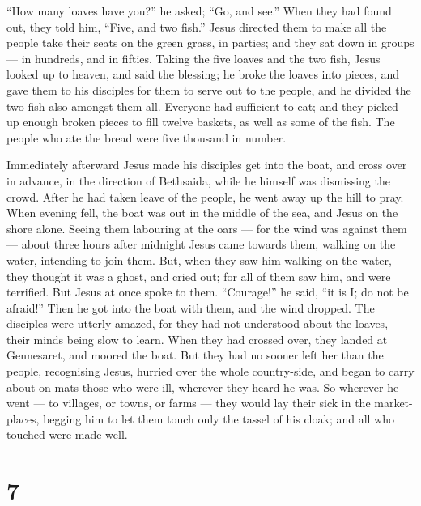  ``How many loaves have you?'' he asked; ``Go, and see.''
When they had found out, they told him, ``Five, and two fish.''
 Jesus directed them to make all the people take their
seats on the green grass, in parties;  and they sat down in
groups --- in hundreds, and in fifties.  Taking the five
loaves and the two fish, Jesus looked up to heaven, and said the
blessing; he broke the loaves into pieces, and gave them to his
disciples for them to serve out to the people, and he divided the two
fish also amongst them all.  Everyone had sufficient to
eat;  and they picked up enough broken pieces to fill
twelve baskets, as well as some of the fish.  The people
who ate the bread were five thousand in number.

 Immediately afterward Jesus made his disciples get into
the boat, and cross over in advance, in the direction of Bethsaida,
while he himself was dismissing the crowd.  After he had
taken leave of the people, he went away up the hill to pray.
 When evening fell, the boat was out in the middle of the
sea, and Jesus on the shore alone.  Seeing them labouring
at the oars --- for the wind was against them --- about three hours
after midnight Jesus came towards them, walking on the water, intending
to join them.  But, when they saw him walking on the water,
they thought it was a ghost, and cried out;  for all of
them saw him, and were terrified. But Jesus at once spoke to them.
``Courage!'' he said, ``it is I; do not be afraid!''  Then
he got into the boat with them, and the wind dropped. The disciples were
utterly amazed,  for they had not understood about the
loaves, their minds being slow to learn.  When they had
crossed over, they landed at Gennesaret, and moored the boat.
 But they had no sooner left her than the people,
recognising Jesus,  hurried over the whole country-side,
and began to carry about on mats those who were ill, wherever they heard
he was.  So wherever he went --- to villages, or towns, or
farms --- they would lay their sick in the market-places, begging him to
let them touch only the tassel of his cloak; and all who touched were
made well.

\hypertarget{section-6}{%
\section{7}\label{section-6}}

